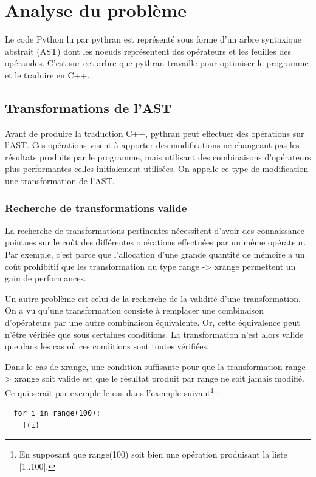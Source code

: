 \documentclass[a4paper]{article}
\begin{document}
\section{Analyse du problème}

Le code Python lu par pythran est représenté sous forme d'un arbre
syntaxique abstrait (AST) dont les noeuds représentent des opérateurs
et les feuilles des opérandes. C'est sur cet arbre que pythran
travaille pour optimiser le programme et le traduire en C++.

\subsection{Transformations de l'AST}

Avant de produire la traduction C++, pythran peut effectuer des
opérations sur l'AST. Ces opérations visent à apporter des
modifications ne changeant pas les résultats produits par le
programme, mais utilisant des combinaisons d'opérateurs plus
performantes celles initialement utilisées. On appelle ce type de
modification une transformation de l'AST.

\subsubsection{Recherche de transformations valide}

La recherche de transformations pertinentes nécessitent d'avoir des
connaissance pointues sur le coût des différentes opérations
effectuées par un même opérateur. Par exemple, c'est parce que
l'allocation d'une grande quantité de mémoire a un coût prohibitif que
les transformation du type range -> xrange permettent un gain de
performances.

Un autre problème est celui de la recherche de la validité d'une
transformation. On a vu qu'une transformation consiste à remplacer une
combinaison d'opérateurs par une autre combinaison équivalente. Or,
cette équivalence peut n'être vérifiée que sous certaines
conditions. La transformation n'est alors valide que dans les cas où
ces conditions sont toutes vérifiées.

Dans le cas de xrange, une condition suffisante pour que la
transformation range -> xrange soit valide est que le résultat produit
par range ne soit jamais modifié. Ce qui serait par exemple le cas
dans l'exemple suivant\footnote{En supposant que range(100) soit bien
  une opération produisant la liste [1..100].} :

\begin{verbatim}
  for i in range(100):
    f(i)
\end{verbatim}
\end{document}
